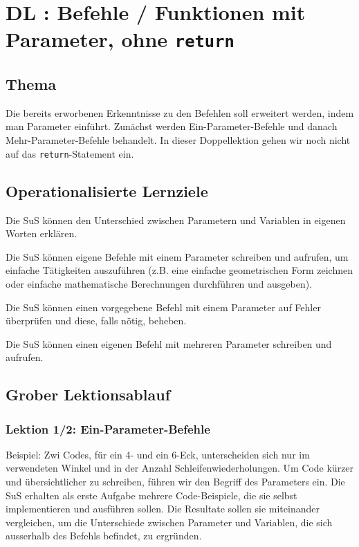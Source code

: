 \section{DL \themycounter: Befehle / Funktionen mit Parameter, ohne \texorpdfstring{\lstinline|return|}{return}}
\begin{myExBox}[title=DL \themycounter]
\subsection*{Thema}
Die bereits erworbenen Erkenntnisse zu den Befehlen soll erweitert werden, indem man Parameter einführt. Zunächst werden Ein-Parameter-Befehle und danach Mehr-Parameter-Befehle behandelt. In dieser Doppellektion gehen wir noch nicht auf das \lstinline|return|-Statement ein. 


\subsection*{Operationalisierte Lernziele}
\begin{todolist}
    \item Die SuS können den Unterschied zwischen Parametern und Variablen in eigenen Worten erklären.
    \item Die SuS können eigene Befehle mit einem Parameter schreiben und aufrufen, um einfache Tätigkeiten auszuführen (z.B. eine einfache geometrischen Form zeichnen oder einfache mathematische Berechnungen durchführen und ausgeben).
    \item Die SuS können einen vorgegebene Befehl mit einem Parameter auf Fehler überprüfen und diese, falls nötig, beheben. 
    \item Die SuS können einen eigenen Befehl mit mehreren Parameter schreiben und aufrufen.
\end{todolist}

\subsection*{Grober Lektionsablauf}
\subsubsection*{Lektion 1/2: Ein-Parameter-Befehle}
Beispiel: Zwi Codes, für ein 4- und ein 6-Eck, unterscheiden sich nur im verwendeten Winkel und in der Anzahl Schleifenwiederholungen. Um Code kürzer und übersichtlicher zu schreiben, führen wir den Begriff des Parameters ein. Die SuS erhalten als erste Aufgabe mehrere Code-Beispiele, die sie selbst implementieren und ausführen sollen. Die Resultate sollen sie miteinander vergleichen, um die Unterschiede zwischen Parameter und Variablen, die sich ausserhalb des Befehls befindet, zu ergründen.


\end{myExBox}
